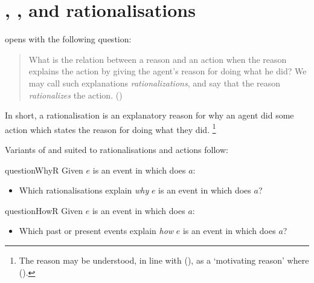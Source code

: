 \chapter{\qWhy{}, \qHow{}, and rationalisations}
\label{sec:reasons}


\begin{note}
  \citeauthor{Davidson:1963aa} opens  with the following question:
  \begin{quote}
    What is the relation between a reason and an action when the reason explains the action by giving the agent's reason for doing what he did?
    We may call such explanations \emph{rationalizations}, and say that the reason \emph{rationalizes} the action.%
    \mbox{}\hfill\mbox{(\citeyear[685]{Davidson:1963aa})}
  \end{quote}
  In short, a rationalisation is an explanatory reason for why an agent did some action which states the \agents{} reason for doing what they did.%
  \footnote{
    The \agents{} reason may be understood, in line with \citeauthor{Smith:1994wo} (\citeyear{Smith:1994wo}), as a `motivating reason' where
    (\citeyear[96]{Smith:1994wo}).
  }

  Variants of \qWhy{} and \qHow{} suited to rationalisations and actions follow:

  \begin{question}{questionWhyR}{\qWhyR{}}
    Given \(e\) is an event in which \vAgent{} does \(a\):

    \begin{itemize}
    \item
      Which rationalisations explain \emph{why} \(e\) is an event in which \vAgent{} does \(a\)?
    \end{itemize}
    \vspace{-1.5\baselineskip}
  \end{question}

  \begin{question}{questionHowR}{\qHowR{}}
    Given \(e\) is an event in which \vAgent{} does \(a\):

    \begin{itemize}
    \item
      Which past or present events explain \emph{how} \(e\) is an event in which \vAgent{} does \(a\)?
    \end{itemize}
    \vspace{-1.5\baselineskip}
  \end{question}


\end{note}
